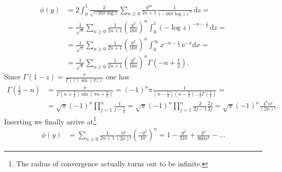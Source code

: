\documentclass[english, parskip=full]{scrartcl}
\newcommand{\intx}{}
\newcommand{\kla}{}
\newcommand{\klam}{}
\newcommand{\e}{\text{e}}
\begin{document}
\begin{align}
\phi(y) &= 2 \intx\int_{0}^{1} \frac{2}{\sqrt{-16\pi\log z}} \sum_{n\ge 0} \frac{y^{2n}}{2n+1} \frac{1}{(-16\pi \log z)^{n}}  \, \mathrm{d}z = \\
&= \frac{1}{\sqrt{\pi}} \sum_{n\ge 0} \frac{1}{2n+1} \kla\left( \frac{y^2}{16\pi} \right)^n \intx\int_{0}^{1} (-\log z)^{-n - \frac{1}{2}} \, \mathrm{d}z = \\
&= \frac{1}{\sqrt{\pi}} \sum_{n\ge 0} \frac{1}{2n+1} \kla\left( \frac{y^2}{16\pi} \right)^n \intx\int_{0}^{\infty} x^{-n - \frac{1}{2}}  \,\e^{-x} \mathrm{d}x = \\
&= \frac{1}{\sqrt{\pi}} \sum_{n\ge 0} \frac{1}{2n+1} \kla\left( \frac{y^2}{16\pi} \right)^n \Gamma\kla\left( -n + \frac{1}{2} \right).
\end{align}
Since $\Gamma(1 - z) = \frac{\pi}{\Gamma(z) \sin(\pi z)}$ one has
\begin{align}
 \Gamma\kla\left( \frac{1}{2} - n \right) &= \frac{\pi}{\Gamma\kla\left( n + \frac{1}{2} \right) \sin\kla\left( \pi n + \frac{\pi}{2} \right)} = (-1)^n \pi \frac{1}{\kla\left( n - \frac{1}{2} \right) \kla\left( n - \frac{3}{2} \right) \dots \frac{1}{2} \Gamma\kla\left( \frac{1}{2} \right)} = \\
 &= \sqrt{\pi} (-1)^n \prod_{j = 1}^n \frac{1}{j - \frac{1}{2}} = \sqrt{\pi} (-1)^n \prod_{j = 1}^n \frac{2}{2j - 1} \frac{2j}{2j} = \sqrt{\pi} (-1)^n \frac{4^n n!}{(2n)!}.
\end{align}
Inserting we finally arrive at\footnote{The radius of convergence actually turns out to be infinite.}
\begin{align}
\phi(y) &= \sum_{n\ge 0} \frac{1}{2n+1} \frac{n!}{(2n)!} \kla\left( \frac{-y^2}{4\pi} \right)^n = 1 - \frac{y^2}{24\pi} + \frac{y^4}{960\pi^2} - \dots
\end{align}
\end{document}
